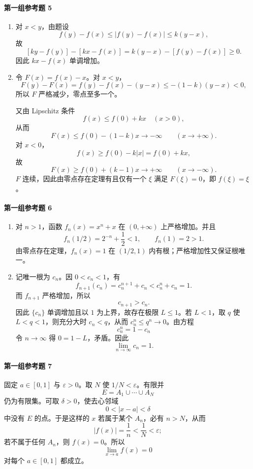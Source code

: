 \paragraph{第一组参考题 5}
\begin{xsolution}
\begin{enumerate}[label=(\arabic*)]
 \item 对 $x<y$，由题设
 \[
  f(y)-f(x)\le |f(y)-f(x)|\le k(y-x),
 \]
 故
 \[
  [ky-f(y)]-[kx-f(x)]
  =k(y-x)-[f(y)-f(x)]\ge0.
 \]
 因此 $kx-f(x)$ 单调增加。

 \item 令 $F(x)=f(x)-x$。对 $x<y$，
 \[
  F(y)-F(x)=f(y)-f(x)-(y-x)
  \le -(1-k)(y-x)<0,
 \]
 所以 $F$ 严格减少，零点至多一个。

 又由 Lipschitz 条件
 \[
  f(x)\le f(0)+kx\quad(x>0),
 \]
 从而
 \[
  F(x)\le f(0)-(1-k)x\to-\infty
  \qquad(x\to+\infty).
 \]
 对 $x<0$，
 \[
  f(x)\ge f(0)-k|x|=f(0)+kx,
 \]
 故
 \[
  F(x)\ge f(0)+(k-1)x\to+\infty
  \qquad(x\to-\infty).
 \]
 $F$ 连续，因此由零点存在定理有且仅有一个 $\xi$ 满足 $F(\xi)=0$，即 $f(\xi)=\xi$。
\end{enumerate}
\end{xsolution}

\paragraph{第一组参考题 6}
\begin{xsolution}
\begin{enumerate}[label=(\arabic*)]
 \item 对 $n>1$，函数 $f_n(x)=x^n+x$ 在 $(0,+\infty)$ 上严格增加。并且
 \[
  f_n(1/2)=2^{-n}+\frac12<1,
  \qquad f_n(1)=2>1.
 \]
 由零点存在定理，$f_n(x)=1$ 在 $(1/2,1)$ 内有根；严格增加性又保证根唯一。

 \item 记唯一根为 $c_n$。因 $0<c_n<1$，有
 \[
  f_{n+1}(c_n)=c_n^{n+1}+c_n<c_n^n+c_n=1.
 \]
 而 $f_{n+1}$ 严格增加，所以
 \[
  c_{n+1}>c_n.
 \]
 因此 $\{c_n\}$ 单调增加且以 $1$ 为上界，故存在极限 $L\le1$。若 $L<1$，取 $q$ 使 $L<q<1$，则充分大时 $c_n<q$，从而 $c_n^n\le q^n\to0$。由方程
 \[
  c_n^n=1-c_n
 \]
 令 $n\to\infty$ 得 $0=1-L$，矛盾。因此
 \[
  \boxed{\lim_{n\to\infty}c_n=1}.
 \]
\end{enumerate}
\end{xsolution}

\paragraph{第一组参考题 7}
\begin{xsolution}
固定 $a\in[0,1]$ 与 $\varepsilon>0$。取 $N$ 使 $1/N<\varepsilon$。有限并
\[
 E=A_1\cup\cdots\cup A_N
\]
仍为有限集。可取 $\delta>0$，使去心邻域
\[
 0<|x-a|<\delta
\]
中没有 $E$ 的点。于是这样的 $x$ 若属于某个 $A_n$，必有 $n>N$，从而
\[
 |f(x)|=\frac1n<\frac1N<\varepsilon;
\]
若不属于任何 $A_n$，则 $f(x)=0$。所以
\[
 \boxed{\lim_{x\to a}f(x)=0}
\]
对每个 $a\in[0,1]$ 都成立。
\end{xsolution}

